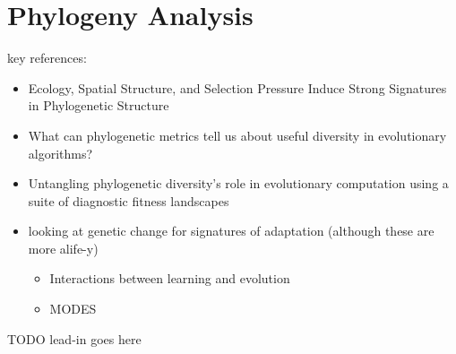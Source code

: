 \section{Phylogeny Analysis}
\label{sec:phylogeny-analysis}

key references:
\begin{itemize}
  \item Ecology, Spatial Structure, and Selection Pressure Induce Strong Signatures in Phylogenetic Structure \citep{moreno2025ecology}
  \item What can phylogenetic metrics tell us about useful diversity in evolutionary algorithms? \citep{hernandez2022can}
  \item Untangling phylogenetic diversity's role in evolutionary computation using a suite of diagnostic fitness landscapes \citep{shahbandegan2022untangling}
  \item looking at genetic change for signatures of adaptation (although these are more alife-y)
  \begin{itemize}
    \item Interactions between learning and evolution \citep{ackley1991interactions}
    \item MODES \citep{dolson2019modes}
  \end{itemize}
\end{itemize}

TODO lead-in goes here


